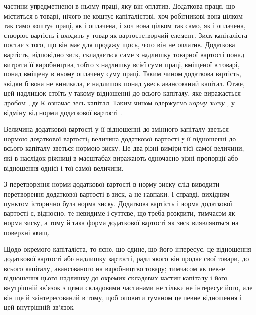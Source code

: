 \parcont{}  %
частини упредметненої в ньому праці, яку він оплатив. Додаткова
праця, що міститься в товарі, нічого не коштує капіталістові,
хоч робітникові вона цілком так само коштує праці, як
і оплачена, і хоч вона цілком так само, як і оплачена, створює
вартість і входить у товар як вартостетворчий елемент. Зиск
капіталіста постає з того, що він має для продажу щось, чого
він не оплатив. Додаткова вартість, відповідно зиск, складається
саме з надлишку товарної вартості понад витрати її виробництва,
тобто з надлишку всієї суми праці, вміщеної в товарі, понад
вміщену в ньому оплачену суму праці. Таким чином додаткова
вартість, звідки б вона не виникала, є надлишок понад увесь
авансований капітал. Отже, цей надлишок стоїть у такому відношенні
до всього капіталу, яке виражається дробом , де
$К$ означає весь капітал. Таким чином одержуємо \emph{норму зиску}
 \deq{} , у відміну від норми додаткової вартості .

Величина додаткової вартості у її відношенні до змінного
капіталу зветься нормою додаткової вартості; величина додаткової
вартості у її відношенні до всього капіталу зветься нормою зиску.
Це два різні виміри тієї самої величини, які в наслідок ріжниці в
масштабах виражають одночасно різні пропорції або відношення
однієї і тої самої величини.

З перетворення норми додаткової вартості в норму зиску
слід виводити перетворення додаткової вартості в зиск, а не
навпаки. І справді, вихідним пунктом історично була норма зиску.
Додаткова вартість і норма додаткової вартості є, відносно, те
невидиме і суттєве, що треба розкрити, тимчасом як норма
зиску, а тому й така форма додаткової вартості як зиск виявляються
на поверхні явищ.

Щодо окремого капіталіста, то ясно, що єдине, що його
інтересує, це відношення додаткової вартості або надлишку вартості,
ради якого він продає свої товари, до всього капіталу,
авансованого на виробництво товару; тимчасом як певне відношення
цього надлишку до окремих складових частин капіталу
і його внутрішній зв’язок з цими складовими частинами не тільки
не інтересує його, але він ще й заінтересований в тому, щоб
оповити туманом це певне відношення і цей внутрішній зв’язок.

